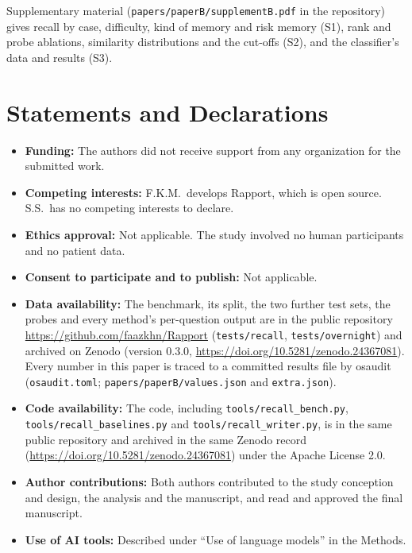 \documentclass[sn-mathphys-num]{sn-jnl}
\begin{document}
\backmatter

Supplementary material (\texttt{papers/paperB/supplementB.pdf} in the repository) gives recall by case, difficulty, kind of memory and risk memory (S1), rank and probe ablations,
similarity distributions and the cut-offs (S2), and the classifier's data and results (S3).

\section*{Statements and Declarations}
\begin{itemize}
\item \textbf{Funding:} The authors did not receive support from any organization for the submitted work.
\item \textbf{Competing interests:} F.K.M.\ develops Rapport, which is open source. S.S.\ has no competing interests to declare.
\item \textbf{Ethics approval:} Not applicable. The study involved no human participants and no patient data.
\item \textbf{Consent to participate and to publish:} Not applicable.
\item \textbf{Data availability:} The benchmark, its split, the two further test sets, the probes and every method's per-question output are
in the public repository \url{https://github.com/faazkhn/Rapport} (\texttt{tests/recall}, \texttt{tests/overnight}) and archived on Zenodo
(version 0.3.0, \url{https://doi.org/10.5281/zenodo.24367081}). Every number in this paper is traced to a committed results file by osaudit
(\texttt{osaudit.toml}; \texttt{papers/paperB/values.json} and \texttt{extra.json}).
\item \textbf{Code availability:} The code, including \texttt{tools/recall\_bench.py}, \texttt{tools/recall\_baselines.py} and
\texttt{tools/recall\_writer.py}, is in the same public repository and archived in the same Zenodo record (\url{https://doi.org/10.5281/zenodo.24367081}) under the Apache
License 2.0.
\item \textbf{Author contributions:} Both authors contributed to the study conception and design, the analysis and the manuscript, and
read and approved the final manuscript.
\item \textbf{Use of AI tools:} Described under ``Use of language models'' in the Methods.
\end{itemize}


\end{document}
